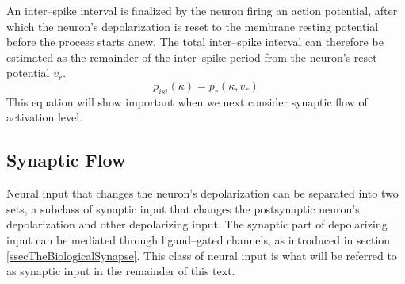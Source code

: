 	An inter--spike interval is finalized by the neuron firing an action potential, after which the neuron's depolarization is reset to the membrane resting potential before the process starts anew.
	The total inter--spike interval can therefore be estimated as the remainder of the inter--spike period from the neuron's reset potential $v_r$.
\begin{equation}
	p_{isi}(\kappa) = p_r(\kappa, v_r)%
	\label{eqEstimateOfInterSpikePeriod}
\end{equation}
	This equation will show important when we next consider synaptic flow of activation level.
	


    \subsection{Synaptic Flow}
	\label{ssecSynapticFlow}
	Neural input that changes the neuron's depolarization can be separated into two sets, a subclass of synaptic input that changes the postsynaptic neuron's depolarization and other depolarizing input.
	The synaptic part of depolarizing input can be mediated through ligand--gated channels, as introduced in section \ref{ssecTheBiologicalSynapse}.
	This class of neural input is what will be referred to as synaptic input in the remainder of this text.

